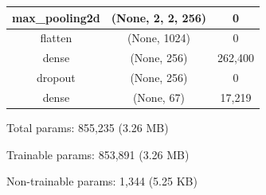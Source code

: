 \documentclass{article}
\begin{document}
\begin{enumerate}
\begin{table}[h!]
\begin{tabular}{| c | c | c |}
                    \hline
                    max\_pooling2d & (None, 2, 2, 256) & 0 \\
                    \hline
                    flatten & (None, 1024) & 0 \\
                    \hline
                    dense & (None, 256) & 262,400 \\
                    \hline
                    dropout & (None, 256) & 0 \\
                    \hline
                    dense & (None, 67) & 17,219 \\
                    \hline
                \end{tabular}
            \end{table}
        
            Total params: 855,235 (3.26 MB)
        
            Trainable params: 853,891 (3.26 MB)
        
            Non-trainable params: 1,344 (5.25 KB)
    
        
        \newpage


\end{enumerate}
\end{document}
